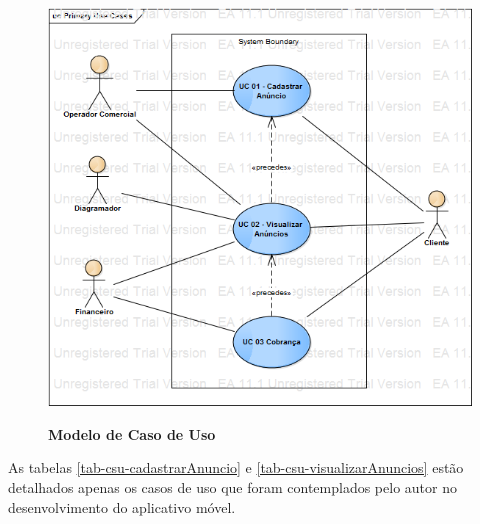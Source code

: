 \documentclass[
	12pt,				%
	openright,			%
	oneside,			%
	a4paper,			%
	chapter=TITLE,		%
	section=TITLE,		%
	english,			%
	french,				%
	spanish,			%
	brazil				%
	]{abntex2}
\begin{document}
\begin{figure}[htb]
	\begin{center}
		\caption{
			\textbf{Modelo de Caso de Uso}
		}\label{fig-modelo-uc}
		\includegraphics [scale=0.5]{imagens/modelo_caso_de_uso.png}
		\label{fig-modelo-uc}
	\end{center}
\end{figure}

As tabelas \ref{tab-csu-cadastrarAnuncio} e \ref{tab-csu-visualizarAnuncios} estão detalhados apenas os casos de uso que foram contemplados pelo autor no desenvolvimento do aplicativo móvel.
\end{document}
